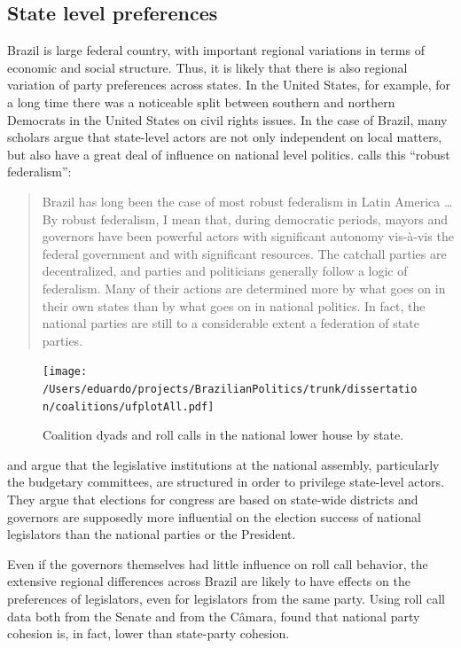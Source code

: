 \subsection{State level preferences}



Brazil is large federal country, with important regional variations in terms of economic and social structure. Thus, it is likely that there is also regional variation of party preferences across states. In the United States, for example, for a long time there was a noticeable split between southern and northern Democrats in the United States on civil rights issues\citep{poole:1997}. In the case of Brazil, many scholars argue that state-level actors are not only independent on local matters, but also have a great deal of influence on national level politics. \citet{mainwaring:1997a} calls this ``robust federalism'': 

\begin{quote}
  Brazil has long been the case of most robust federalism in Latin America \dots By robust federalism, I mean that, during democratic periods, mayors and governors have been powerful actors with significant autonomy vis-à-vis the federal government and with significant resources. The catchall parties are decentralized, and parties and politicians generally follow a logic of federalism. Many of their actions are determined more by what goes on in their own states than by what goes on in national politics. In fact, the national parties are still to a considerable extent a federation of state parties.\citep[p.83]{mainwaring:1997a}\end{quote} 


\begin{figure}
  \centering
  \texttt{[image: /Users/eduardo/projects/BrazilianPolitics/trunk/dissertation/coalitions/ufplotAll.pdf]}
  \caption{Coalition dyads and roll calls in the national lower house by state.}
  \label{fig:coalplot}
\end{figure}

\citet{Samuels:2003} and \citet{abrucio:1998} argue that the legislative institutions at the national assembly, particularly the budgetary committees, are structured in order to privilege state-level actors. They argue that  elections for congress are based on state-wide districts and governors  are supposedly more influential on the election success of national legislators than the national parties or the President.   

Even if the governors themselves had little influence on roll call behavior, the extensive regional differences across Brazil are likely to have effects on the preferences of legislators, even for legislators from the same party. Using roll call data both from the Senate and from the Câmara, \citet{desposato:2003} found that national party cohesion is, in fact, lower than state-party cohesion. 

